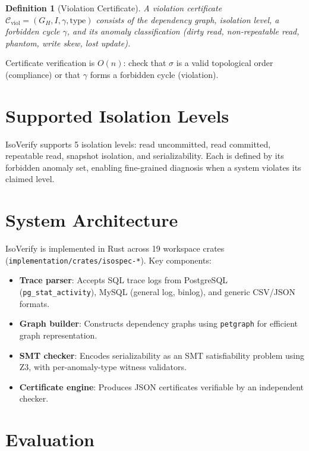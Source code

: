\documentclass[11pt]{article}
\newtheorem{definition}[theorem]{Definition}
\begin{document}
\begin{definition}[Violation Certificate]
A violation certificate $\mathcal{C}_{\text{viol}} = (G_H, I, \gamma,
\text{type})$ consists of the dependency graph, isolation level, a forbidden
cycle $\gamma$, and its anomaly classification (dirty read, non-repeatable
read, phantom, write skew, lost update).
\end{definition}

Certificate verification is $O(n)$: check that $\sigma$ is a valid
topological order (compliance) or that $\gamma$ forms a forbidden cycle
(violation).

\section{Supported Isolation Levels}
\label{sec:levels}

IsoVerify supports 5 isolation levels: read uncommitted, read committed,
repeatable read, snapshot isolation, and serializability.  Each is defined
by its forbidden anomaly set, enabling fine-grained diagnosis when a system
violates its claimed level.

\section{System Architecture}
\label{sec:system}

IsoVerify is implemented in Rust across 19 workspace crates
(\texttt{implementation/crates/isospec-*}).  Key components:
\begin{itemize}
\item \textbf{Trace parser}: Accepts SQL trace logs from PostgreSQL
  (\texttt{pg\_stat\_activity}), MySQL (general log, binlog), and generic
  CSV/JSON formats.
\item \textbf{Graph builder}: Constructs dependency graphs using
  \texttt{petgraph} for efficient graph representation.
\item \textbf{SMT checker}: Encodes serializability as an SMT satisfiability
  problem using Z3, with per-anomaly-type witness validators.
\item \textbf{Certificate engine}: Produces JSON certificates verifiable by an
  independent checker.
\end{itemize}

\section{Evaluation}
\label{sec:eval}
\end{document}
